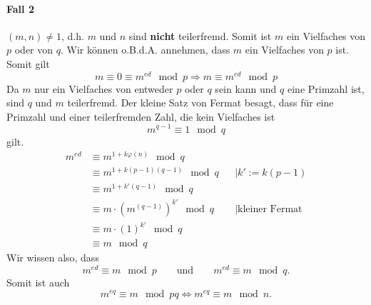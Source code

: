 \paragraph{Fall 2} $(m,n)\neq 1$, d.h. $m$ und $n$ sind \textbf{nicht} teilerfremd. Somit ist
$m$ ein Vielfaches von $p$ oder von $q$. Wir können o.B.d.A. annehmen, dass $m$ ein Vielfaches von $p$ ist.
Somit gilt \[
    m \equiv 0 \equiv m^{ed} \mod p \Longrightarrow m\equiv m^{ed}\mod p
\]
Da $m$ nur ein Vielfaches von entweder $p$ oder $q$ sein kann und $q$ eine Primzahl ist, sind $q$ und $m$ teilerfremd.
Der kleine Satz von Fermat besagt, dass für eine Primzahl und einer teilerfremden Zahl, die kein Vielfaches ist
\[
    m^{q-1}\equiv 1\mod q
\]
gilt.
\begin{align*}
    m^{ed} &\equiv m^{1 + k\varphi(n)}\mod q\\
    &\equiv m^{1 + k(p-1)(q-1)}\mod q && \mid k' := k(p-1)\\
    &\equiv m^{1 + k'(q-1)}\mod q\\
    &\equiv m\cdot \left(m^{(q-1)}\right)^{k'}\mod q && \mid \text{kleiner Fermat}\\
    &\equiv m\cdot (1)^{k'}\mod q\\
    &\equiv m \mod q
\end{align*}
Wir wissen also, dass 
\[
    m^{ed} \equiv m \mod p\qquad\text{und}\qquad m^{ed} \equiv m \mod q.
\]
Somit ist auch
\[
    m^{eq} \equiv m \mod pq \Longleftrightarrow m^{eq} \equiv m \mod n.
\]